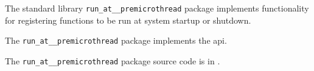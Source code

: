 
The standard library {\tt run\_at\_\_premicrothread} package implements functionality for registering 
functions to be run at system startup or shutdown. 

The {\tt run\_at\_\_premicrothread} package implements the  api.

The {\tt run\_at\_\_premicrothread} package source code is in .
